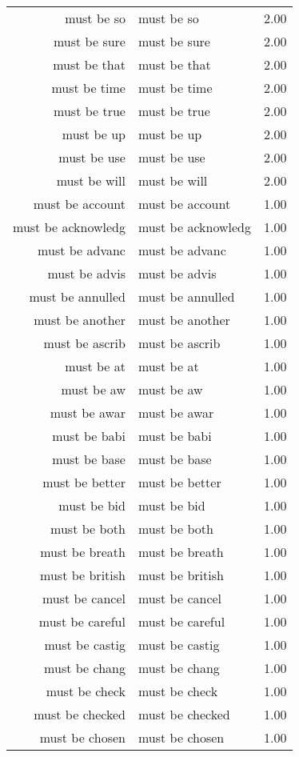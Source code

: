 \begin{table}[ht]
\begin{tabular}{rlr}
  must be so & must be so & 2.00 \\ 
  must be sure & must be sure & 2.00 \\ 
  must be that & must be that & 2.00 \\ 
  must be time & must be time & 2.00 \\ 
  must be true & must be true & 2.00 \\ 
  must be up & must be up & 2.00 \\ 
  must be use & must be use & 2.00 \\ 
  must be will & must be will & 2.00 \\ 
  must be account & must be account & 1.00 \\ 
  must be acknowledg & must be acknowledg & 1.00 \\ 
  must be advanc & must be advanc & 1.00 \\ 
  must be advis & must be advis & 1.00 \\ 
  must be annulled & must be annulled & 1.00 \\ 
  must be another & must be another & 1.00 \\ 
  must be ascrib & must be ascrib & 1.00 \\ 
  must be at & must be at & 1.00 \\ 
  must be aw & must be aw & 1.00 \\ 
  must be awar & must be awar & 1.00 \\ 
  must be babi & must be babi & 1.00 \\ 
  must be base & must be base & 1.00 \\ 
  must be better & must be better & 1.00 \\ 
  must be bid & must be bid & 1.00 \\ 
  must be both & must be both & 1.00 \\ 
  must be breath & must be breath & 1.00 \\ 
  must be british & must be british & 1.00 \\ 
  must be cancel & must be cancel & 1.00 \\ 
  must be careful & must be careful & 1.00 \\ 
  must be castig & must be castig & 1.00 \\ 
  must be chang & must be chang & 1.00 \\ 
  must be check & must be check & 1.00 \\ 
  must be checked & must be checked & 1.00 \\ 
  must be chosen & must be chosen & 1.00 \\ 

\end{tabular}
\end{table}
